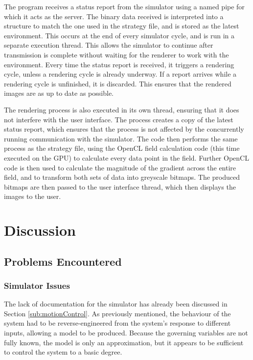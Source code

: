 \documentclass[10pt]{article}
\begin{document}
The program receives a status report from the simulator using a named pipe for
which it acts as the server. The binary data received is interpreted into a
structure to match the one used in the strategy file, and is stored as the
latest environment. This occurs at the end of every simulator cycle, and is run
in a separate execution thread. This allows the simulator to continue after
transmission is complete without waiting for the renderer to work with the
environment. Every time the status report is received, it triggers a rendering
cycle, unless a rendering cycle is already underway. If a report arrives while a
rendering cycle is unfinished, it is discarded. This ensures that the rendered
images are as up to date as possible.

The rendering process is also executed in its own thread, ensuring that it does
not interfere with the user interface. The process creates a copy of the latest
status report, which ensures that the process is not affected by the
concurrently running communication with the simulator. The code then performs
the same process as the strategy file, using the OpenCL field calculation code
(this time executed on the GPU) to calculate every data point in the field.
Further OpenCL code is then used to calculate the magnitude of the gradient
across the entire field, and to transform both sets of data into greyscale
bitmaps. The produced bitmaps are then passed to the user interface thread,
which then displays the images to the user.

\section{Discussion}

\subsection{Problems Encountered} 

\subsubsection{Simulator Issues\label{sub:simulatorIssues}}

The lack of documentation for the simulator has already been discussed in
Section \ref{sub:motionControl}.  As previously mentioned, the behaviour of the
system had to be reverse-engineered from the system's response to different
inputs, allowing a model to be produced.  Because the governing variables are
not fully known, the model is only an approximation, but it appears to be
sufficient to control the system to a basic degree.
\end{document}
